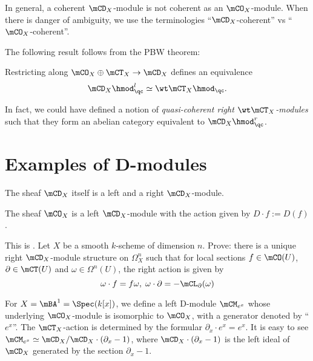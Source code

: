 	\begin{warn}
		In general, a coherent $\mCD_X$-module is not coherent as an $\mCO_X$-module. When there is danger of ambiguity, we use the terminologies ``$\mCD_X$-coherent'' vs ``$\mCO_X$-coherent''.
	\end{warn}

	The following result follows from the PBW theorem:

	\begin{prop}
		Restricting along $\mCO_X\oplus\mCT_X \to \mCD_X$ defines an equivalence
		\[
			\mCD_X\hmod^l_\qc \simeq \wt\mCT_X\hmod_\qc.
		\]
	\end{prop}

	\begin{rem}
		In fact, we could have defined a notion of \emph{quasi-coherent right $\wt\mCT_X$-modules} such that they form an abelian category equivalent to $\mCD_X\hmod^r_\qc$.
	\end{rem}

\section{Examples of D-modules}

	\begin{exam}
		The sheaf $\mCD_X$ itself is a left and a right $\mCD_X$-module.
	\end{exam}

	\begin{exam}
		The sheaf $\mCO_X$ is a left $\mCD_X$-module with the action given by $D\cdot f:=D(f)$.
	\end{exam}

	\begin{exe}
		This is . Let $X$ be a smooth $k$-scheme of dimension $n$. Prove: there is a unique right $\mCD_X$-module structure on $\Omega_X^n$ such that for local sections $f\in \mCO(U)$, $\partial\in \mCT(U)$ and $\omega\in \Omega^n(U)$, the right action is given by
		\[
			\omega \cdot f = f\omega,\; \omega \cdot \partial = -\mCL_\partial(\omega)
		\]
	\end{exe}

	\begin{exam}
		For $X=\mBA^1=\Spec (k[x])$, we define a left D-module $\mCM_{e^x}$ whose underlying $\mCO_X$-module is isomorphic to $\mCO_X$, with a generator denoted by ``$e^x$''. The $\mCT_X$-action is determined by the formular $\partial_x \cdot e^x = e^x$. It is easy to see $\mCM_{e^x} \simeq \mCD_X/\mCD_X\cdot(\partial_x-1)$, where $\mCD_X\cdot(\partial_x-1)$ is the left ideal of $\mCD_X$ generated by the section $\partial_x-1$.
	\end{exam}

